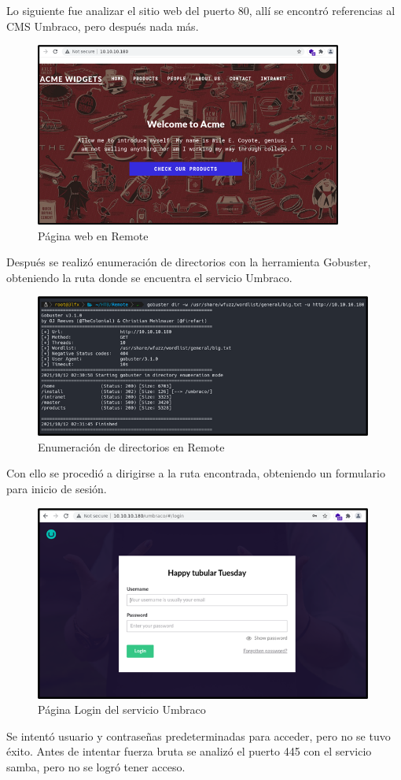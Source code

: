 Lo siguiente fue analizar el sitio web del puerto 80, allí se encontró referencias al CMS Umbraco, pero después nada más.
\begin{figure}[H]
    \centering
    \includegraphics[width=0.9\textwidth]{imagenes/pagrem.png}
    \caption{Página web en Remote}
\end{figure}
Después se realizó enumeración de directorios con la herramienta Gobuster, obteniendo la ruta donde se encuentra el servicio Umbraco.
\begin{figure}[H]
    \centering
    \includegraphics[width=0.99\textwidth]{imagenes/enudicrem.png}
    \caption{Enumeración de directorios en Remote}
\end{figure}
Con ello se procedió a dirigirse a la ruta encontrada, obteniendo un formulario para inicio de sesión.
\begin{figure}[H]
    \centering
    \includegraphics[width=0.99\textwidth]{imagenes/logumb.png}
    \caption{Página Login del servicio Umbraco}
\end{figure}
Se intentó usuario y contraseñas predeterminadas para acceder, pero no se tuvo éxito. Antes de intentar fuerza bruta se analizó el puerto 445 con el servicio samba, pero no se logró tener acceso.

